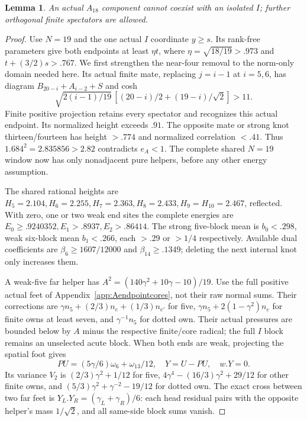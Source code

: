 \documentclass[11pt]{article}
\newtheorem{lemma}[theorem]{Lemma}
\theoremstyle{definition}
\theoremstyle{remark}
\begin{document}
\begin{lemma}\label{app:tail:lem:A18I}
An actual $A_{18}$ component cannot coexist with an isolated $I$;
further orthogonal finite spectators are allowed.
\end{lemma}
\begin{proof}
Use $N=19$ and the one actual $I$ coordinate $y\ge s$.
Its rank-free parameters give both endpoints at least $\eta t$,
where $\eta=\sqrt{18/19}>.973$ and $t+(3/2)s>.767$.
We first strengthen the near-four removal to the norm-only
domain needed here. Its actual finite mate, replacing $j=i-1$
at $i=5,6$, has diagram $B_{20-i}+A_{i-2}+S$ and cosh
\[
 \sqrt{2(i-1)/19}\,[(20-i)/2+(19-i)/\sqrt2]>11.
\]
Finite positive projection retains every spectator and recognizes
this actual endpoint. Its normalized height exceeds $.91$.
The opposite mate or strong knot thirteen/fourteen has height
$>.774$ and normalized correlation $<.41$.
Thus $1.684^2=2.835856>2.82$ contradicts $e_A<1$.
The complete shared $N=19$ window now has only nonadjacent pure
helpers, before any other energy assumption.

The shared rational heights are
$H_5=2.104,H_6=2.255,H_7=2.363,H_8=2.433,H_9=H_{10}=2.467$,
reflected. With zero, one or two weak end sites the complete
energies are $E_0\ge.9240352,E_1>.8937,E_2>.86414$.
The strong five-block mean is $b_0<.298$, weak six-block
mean $b_1<.266$, each $>.29$ or $>1/4$ respectively.
Available dual coefficients are
$\beta_6\ge1607/12000$ and $\beta_{14}\ge.1349$;
deleting the next internal knot only increases them.

A weak-five far helper has
$A^2=(140\gamma^2+10\gamma-10)/19$.
Use the full positive actual feet of Appendix~\ref{app:Aendpointcores},
not their raw normal sums. Their corrections are
$\gamma n_5+(2/3)n_e+(1/3)n_{e'}$ for five,
$\gamma n_5+2(1-\gamma^2)n_e$ for finite owns at least seven,
and $\gamma^{-1}n_5$ for dotted own.
Their actual pressures are bounded below by $A$ minus the
respective finite/core radical; the full $I$ block remains
an unselected acute block.
When both ends are weak, projecting the spatial foot gives
\[
 PU=(5\gamma/6)\omega_6+\omega_{13}/12,
 \quad Y=U-PU,\quad w.Y=0.
\]
Its variance $V_2$ is
$(2/3)\gamma^2+1/12$ for five,
$4\gamma^4-(16/3)\gamma^2+29/12$ for other finite owns,
and $(5/3)\gamma^2+\gamma^{-2}-19/12$ for dotted own.
The exact cross between two far feet is
$Y_L.Y_R=(\gamma_L+\gamma_R)/6$: each head residual
pairs with the opposite helper's mass $1/\sqrt2$, and all
same-side block sums vanish.


\end{proof}
\end{document}
